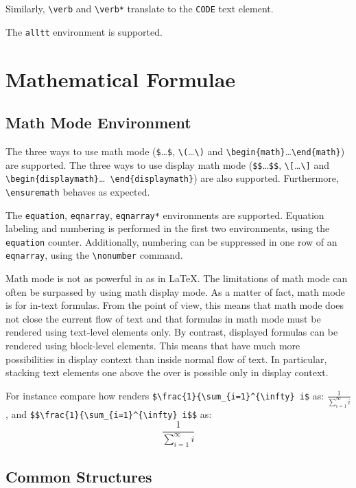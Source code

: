 Similarly, \verb+\verb+ and \verb+\verb*+
translate to the \verb+CODE+ text element.

The \verb+alltt+ environment is supported.

\section{Mathematical Formulae}

\subsection{Math Mode Environment}
The three ways to use math mode (\verb+$+\ldots\verb+$+,
\verb+\(+\ldots\verb+\)+ and
\verb+\begin{math}+\ldots\verb+\end{math}+) are supported.
The three ways to use display math mode (\verb+$$+\ldots\verb+$$+,
\verb+\[+\ldots\verb+\]+ and
\verb+\begin{displaymath}+\ldots\ \verb+\end{displaymath}+) are also
supported.
Furthermore, \verb+\ensuremath+ behaves as expected.


The \verb+equation+, \verb+eqnarray+, \verb+eqnarray*+ environments
are supported.
Equation labeling and numbering is performed in the first two
environments, using the \verb+equation+ counter.
Additionally, numbering can be suppressed in one row of an
\verb+eqnarray+, using the \verb+\nonumber+ command.


Math mode is not as powerful in \hevea{} as in \LaTeX{}.  The
limitations of math mode can often be surpassed by using math display
mode.  As a matter of fact, math mode is for in-text formulas. From
the \html{} point of view, this means that math mode does not close
the current flow of text and that formulas in math mode must be
rendered using text-level elements only.  By contrast, displayed
formulas can be rendered using block-level elements.  This means that
\hevea{} have much more possibilities in display context than inside
normal flow of text.  In particular, stacking text elements one above
the over is possible only in display context.
\begin{htmlonly}
For instance compare how \hevea{} renders
\verb+$\frac{1}{\sum_{i=1}^{\infty} i$+
as: $\frac{1}{\sum_{i=1}^{\infty} i}$, and 
\verb+$$\frac{1}{\sum_{i=1}^{\infty} i$$+ as:
$$\frac{1}{\sum_{i=1}^{\infty} i}$$
\end{htmlonly}


\subsection{Common Structures}

